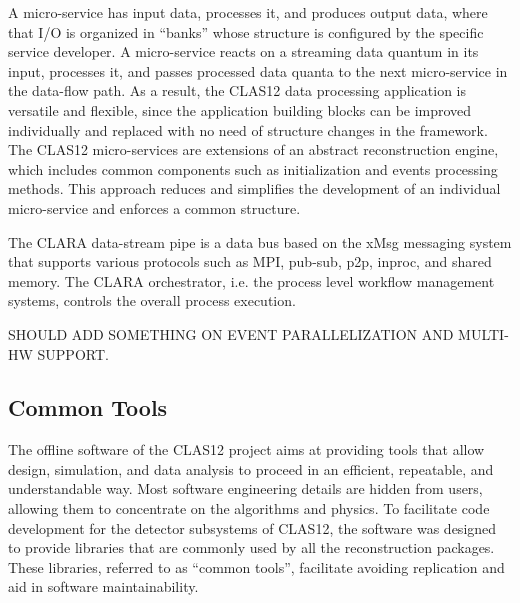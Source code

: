 A micro-service has input data, processes it, and produces output data, where that I/O is organized in ``banks'' whose structure is configured by the specific service developer.  A micro-service reacts on a streaming data quantum in its input, processes it, and passes processed data quanta to the next micro-service in the data-flow path.  As a result, the CLAS12 data processing application is versatile and flexible, since the application building blocks can be improved individually and replaced with no need of structure changes in the framework. The CLAS12 micro-services are extensions of an abstract reconstruction engine, which includes common components such as initialization and events processing methods. This approach reduces and simplifies the development of an individual micro-service and enforces a common structure. 


The CLARA data-stream pipe is a data bus based on the xMsg messaging system that supports various protocols such as MPI, pub-sub, p2p, inproc, and shared memory. The CLARA orchestrator, i.e. the process level workflow management systems, controls the overall process execution. 

{\color{red} SHOULD ADD SOMETHING ON EVENT PARALLELIZATION AND MULTI-HW SUPPORT.}

\subsection{Common Tools}
\label{common-tools}

The offline software of the CLAS12 project aims at providing tools that allow design, simulation, and data analysis to proceed in an efficient, repeatable, and understandable way. Most  software engineering details are hidden from users, allowing them to concentrate on the algorithms and physics.  To facilitate code development for the detector subsystems of CLAS12, the software was designed to provide libraries that are commonly used by all the reconstruction packages.  These libraries, referred to as ``common tools'', facilitate avoiding replication and aid in software maintainability.

